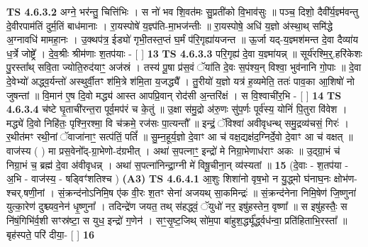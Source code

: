 \documentclass[17pt]{extarticle}
\begin{document}
                  \newline
                                \textbf{ TS 4.6.3.2} \newline
                  अग्ने॒ भर॑न्तु॒ चित्ति॑भिः । स नो॑ भव शि॒वत॑मः सु॒प्रती॑को वि॒भाव॑सुः ॥ पञ्च॒ दिशो॒ दैवी᳚र्य॒ज्ञ्म॑वन्तु दे॒वीरपाम॑तिं दुर्म॒तिं बाध॑मानाः । रा॒यस्पोषे॑ य॒ज्ञ्प॑ति-मा॒भज॑न्तीः ॥ रा॒यस्पोषे॒ अधि॑ य॒ज्ञो अ॑स्था॒थ् समि॑द्धे अ॒ग्नावधि॑ मामहा॒नः । उ॒क्थप॑त्र॒ ईड्यो॑ गृभी॒तस्त॒प्तं घ॒र्मं प॑रि॒गृह्या॑यजन्त ॥ ऊ॒र्जा यद्-य॒ज्ञ्मश॑मन्त दे॒वा दैव्या॑य ध॒र्त्रे जोष्ट्रे᳚ । दे॒व॒श्रीः श्रीम॑णाः श॒तप॑याः - [  ] \textbf{  13} \newline
                  \newline
                                \textbf{ TS 4.6.3.3} \newline
                  परि॒गृह्य॑ दे॒वा य॒ज्ञ्मा॑यन्न् ॥ सूर्य॑रश्मि॒र्॒.हरि॑केशः पु॒रस्ता᳚थ् सवि॒ता ज्योति॒रुद॑याꣳ॒॒ अज॑स्रं । तस्य॑ पू॒षा प्र॑स॒वं ॅया॑ति दे॒वः स॒पंश्य॒न् विश्वा॒ भुव॑नानि गो॒पाः ॥ दे॒वा दे॒वेभ्यो॑ अद्ध्व॒र्यन्तो॑ अस्थुर्वी॒तꣳ श॑मि॒त्रे श॑मि॒ता य॒जद्ध्यै᳚ । तु॒रीयो॑ य॒ज्ञो यत्र॑ ह॒व्यमेति॒ ततः॑ पाव॒का आ॒शिषो॑ नो जुषन्तां ॥ वि॒मान॑ ए॒ष दि॒वो मद्ध्य॑ आस्त आपप्रि॒वान् रोद॑सी अ॒न्तरि॑क्षं । स वि॒श्वाची॑र॒भि - [  ] \textbf{  14} \newline
                  \newline
                                \textbf{ TS 4.6.3.4} \newline
                  च॑ष्टे घृ॒ताची॑रन्त॒रा पूर्व॒मप॑रं च के॒तुं ॥ उ॒क्षा स॑मु॒द्रो अ॑रु॒णः सु॑प॒र्णः पूर्व॑स्य॒ योनिं॑ पि॒तुरा वि॑वेश । मद्ध्ये॑ दि॒वो निहि॑तः॒ पृश्नि॒रश्मा॒ वि च॑क्रमे॒ रज॑सः पा॒त्यन्तौ᳚ ॥ इन्द्रं॒ ॅविश्वा॑ अवीवृधन्थ् समु॒द्रव्य॑चसं॒ गिरः॑ ।र॒थीत॑मꣳ रथी॒नां ॅवाजा॑नाꣳ॒॒ सत्प॑तिं॒ पतिं᳚ ॥ सु॒म्न॒हूर्य॒ज्ञो दे॒वाꣳ आ च॑ वक्ष॒द्यक्ष॑द॒ग्निर्दे॒वो दे॒वाꣳ आ च॑ वक्षत् ॥ वाज॑स्य ( ) मा प्रस॒वेनो᳚द्-ग्रा॒भेणो-द॑ग्रभीत् । अथा॑ स॒पत्नाꣳ॒॒ इन्द्रो॑ मे निग्रा॒भेणाध॑राꣳ अकः ॥ उ॒द्ग्रा॒भं च॑ निग्रा॒भं च॒ ब्रह्म॑ दे॒वा अ॑वीवृधन्न् । अथा॑ स॒पत्ना॑निन्द्रा॒ग्नी मे॑ विषू॒चीना॒न् व्य॑स्यतां ॥ \textbf{  15} \newline
                  \newline
                      (दे॒वाः - श॒तप॑या - अ॒भि - वाज॑स्य॒ - षड्विꣳ॑शतिश्च )  \textbf{(A3)} \newline \newline
                                        \textbf{ TS 4.6.4.1} \newline
                  आ॒शुः शिशा॑नो वृष॒भो न यु॒द्ध्मो घ॑नाघ॒नः क्षोभ॑ण-श्चर्.षणी॒नां । सं॒क्रन्द॑नोऽनिमि॒ष ए॑क वी॒रः श॒तꣳ सेना॑ अजयथ् सा॒कमिन्द्रः॑ ॥ सं॒क्रन्द॑नेना निमि॒षेण॑ जि॒ष्णुना॑ युत्का॒रेण॑ दुश्च्यव॒नेन॑ धृ॒ष्णुना᳚ । तदिन्द्रे॑ण जयत॒ तथ् स॑हद्ध्वं॒ ॅयुधो॑ नर॒ इषु॑हस्तेन॒ वृष्णा᳚ ॥ स इषु॑हस्तैः॒ स नि॑षं॒गिभि॑र्व॒शी सꣳस्र॑ष्टा॒ स युध॒ इन्द्रो॑ ग॒णेन॑ । सꣳ॒॒सृ॒ष्ट॒जिथ् सो॑म॒पा बा॑हुश॒र्द्ध्यू᳚र्द्ध्वध॑न्वा॒ प्रति॑हिताभि॒रस्ता᳚ ॥ बृह॑स्पते॒ परि॑ दीया॒- [  ] \textbf{  16} \newline
\end{document}
